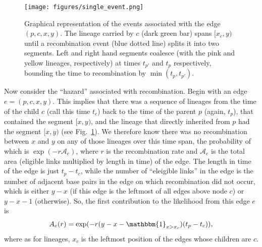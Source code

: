\documentclass{article}
\begin{document}
\begin{figure}
    \centering
    \texttt{[image: figures/single\_event.png]}
    \caption{
    Graphical representation of the events associated with the edge $(p,c,x,y)$.
    The lineage carried by $c$ (dark green bar) spans $[x_c,y)$ 
    until a recombination event (blue
    dotted line) splits it into two segments. Left and right hand segments coalesce
    (with the pink and yellow lineages, respectively)
    at times $t_{p'}$ and $t_p$ respectively, bounding the time to recombination by
    $\min(t_p, t_{p'})$.
    \label{fig:likelihood}
    }
\end{figure}

Now consider the ``hazard'' associated with recombination.
Begin with an edge $e = (p,c,x,y)$.
This implies that there was a sequence of lineages
from the time of the child $c$ (call this time $t_c$)
back to the time of the parent $p$ (again, $t_p$),
that contained the segment $[x,y)$,
and the lineage that directly inherited from $p$
had the segment $[x,y)$ (see Fig.~\ref{fig:likelihood}).
We therefore know there was no recombination between $x$ and $y$
on any of those lineages 
over this time span,
the probability of which is
$\exp(-r \mathcal{A}_e)$, where $r$ is the recombination rate
and $\mathcal{A}_e$ is the total area (eligible links multiplied by length in time) of the edge.
The length in time of the edge is just $t_p - t_c$,
while the number of ``eleigible links'' in the edge is the number of adjacent base pairs in the edge
on which recombination did not occur, which is either $y-x$
(if this edge is the leftmost of all edges above node $c$)
or $y-x-1$ (otherwise).
So, the first contribution to the likelihood from this edge $e$ is
\begin{equation}\label{eq:span}
A_e(r) = \exp(-r (y-x - \mathbbm{1}_{x > x_c})(t_p - t_{c})) ,
\end{equation}
where as for lineages, $x_c$ is the leftmost position of the edges whose children are $c$.
\end{document}
